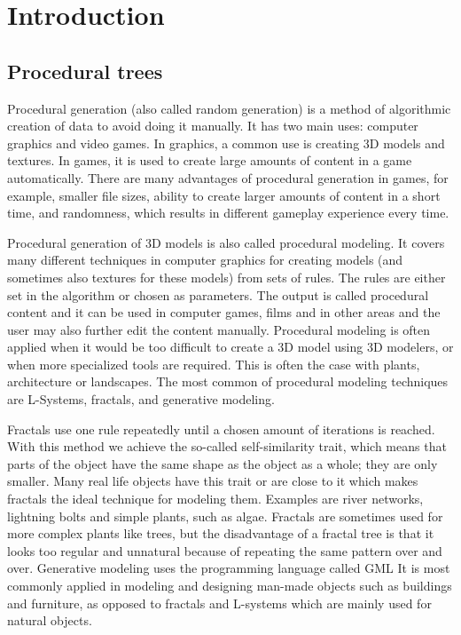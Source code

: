 \documentclass[
  digital, %
  table,   %
  nolof,     %
  nolot,     %
]{fithesis3}
\begin{document}
\chapter{Introduction}
\section{Procedural trees}
Procedural generation (also called random generation) is a method of algorithmic creation of data to avoid doing it manually. It has two main uses: computer graphics and video games. In graphics, a common use is creating 3D models and textures. In games, it is used to create large amounts of content in a game automatically. There are many advantages of procedural generation in games, for example, smaller file sizes, ability to create larger amounts of content in a short time, and randomness, which results in different gameplay experience every time. \par
Procedural generation of 3D models is also called procedural modeling. It covers many different techniques in computer graphics for creating models (and sometimes also textures for these models) from sets of rules. The rules are either set in the algorithm or chosen as parameters. The output is called procedural content and it can be used in computer games, films and in other areas and the user may also further edit the content manually. Procedural modeling is often applied when it would be too difficult to create a 3D model using 3D modelers, or when more specialized tools are required. This is often the case with plants, architecture or landscapes. The most common of procedural modeling techniques are L-Systems, fractals, and generative modeling. \par
Fractals use one rule repeatedly until a chosen amount of iterations is reached. With this method we achieve the so-called self-similarity trait, which means that parts of the object have the same shape as the object as a whole; they are only smaller. Many real life objects have this trait or are close to it which makes fractals the ideal technique for modeling them. Examples are river networks, lightning bolts and simple plants, such as algae. Fractals are sometimes used for more complex plants like trees, but the disadvantage of a fractal tree is that it looks too regular and unnatural because of repeating the same pattern over and over.
Generative modeling uses the programming language called GML It is most commonly applied in modeling and designing man-made objects such as buildings and furniture, as opposed to fractals and L-systems which are mainly used for natural objects. \par
\end{document}

